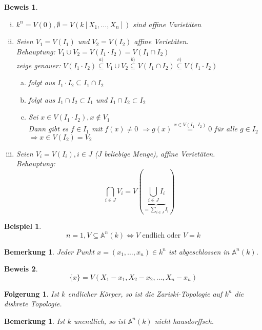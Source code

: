 \documentclass[a4paper,12pt]{report}
\theoremstyle{break}
\newtheorem{Bem}[Def]{Bemerkung}
\newtheorem{Folg}[Def]{Folgerung}
\newtheorem{Bsp}[Def]{Beispiel}
\theoremstyle{nonumberbreak}
\newtheorem{Bew}{Beweis}
\theoremstyle{nonumberplain}
\newcommand{\A}{\mathbb{A}}
\begin{document}
\begin{Bew}\begin{enumerate}[i)]
\item
	$k^n=V(0), \emptyset=V(k[X_1,\dots ,X_n])$ sind affine Variet\"aten
\item
	Seien $V_1=V(I_1)$ und $V_2 =V(I_2)$ affine Veriet\"aten.\\
	\emph{Behauptung:} $V_1 \cup V_2 =V(I_1\cdot I_2)=V(I_1\cap I_2)$\\
	zeige genauer: $V(I_1\cdot I_2) \overset{a)}{\subseteq} V_1 \cup V_2 \overset{b)}{\subseteq} V(I_1\cap I_2) \overset{c)}{\subseteq} V(I_1\cdot I_2)$
	\begin{enumerate}[a)]
	\item[c)] folgt aus $I_1\cdot I_2 \subseteq I_1 \cap I_2$
	\item[b)] folgt aus $I_1 \cap I_2 \subset I_1$ und $I_1 \cap I_2 \subset I_2$
	\item[a)] Sei $x\in V(I_1\cdot I_2), x\notin V_1$\\
		Dann gibt es $f\in I_1$ mit $f(x) \not= 0$ $\Rightarrow  g(x) \stackrel{x\in V(I_1\cdot I_2)}= 0$ f\"ur alle $g\in I_2$\\
		$\Rightarrow x\in V(I_2) = V_2$
	\end{enumerate}
\item
	Seien $V_i = V(I_i),i \in J$ ($J$ beliebige Menge), affine Veriet\"aten.\\
	\emph{Behauptung:} \[ \bigcap_{i\in J} V_i = V(\underbrace{\bigcup_{i\in J} I_i}_{= \sum_{i\in J} I_i}) \]
\end{enumerate}\end{Bew}

\begin{Bsp}\[
	n = 1, V \subseteq \A ^n(k) \Leftrightarrow V \textrm{ endlich oder } V=k
\]\end{Bsp}

\begin{Bem}
Jeder Punkt $x=(x_1,\dots ,x_n)\in k^n$ ist abgeschlossen in $\A ^n(k)$.
\end{Bem}

\begin{Bew}\[
\{x\}= V(X_1-x_1,X_2-x_2,\dots ,X_n-x_n)
\]\end{Bew}

\begin{Folg}
Ist $k$ endlicher K\"orper, so ist die Zariski-Topologie auf $k^n$ die diskrete Topologie.
\end{Folg}

\begin{Bem}
Ist $k$ unendlich, so ist $\A ^n(k)$ nicht hausdorffsch.
\end{Bem}
\end{document}
